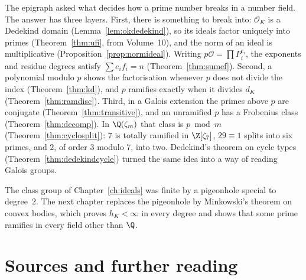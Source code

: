 The epigraph asked what decides how a prime number breaks in a number field. The answer has three layers. First, there
is something to break into: $\mathcal O_K$ is a Dedekind domain (Lemma~\ref{lem:okdedekind}), so its ideals factor
uniquely into primes (Theorem~\ref{thm:ufi}, from Volume~10), and the norm of an ideal is multiplicative
(Proposition~\ref{prop:normideal}). Writing $p\mathcal O=\prod P_i^{e_i}$, the exponents and residue degrees satisfy
$\sum e_if_i=n$ (Theorem~\ref{thm:sumef}). Second, a polynomial modulo $p$ shows the factorisation whenever $p$ does not
divide the index (Theorem~\ref{thm:kd}), and $p$ ramifies exactly when it divides $d_K$ (Theorem~\ref{thm:ramdisc}).
Third, in a Galois extension the primes above $p$ are conjugate (Theorem~\ref{thm:transitive}), and an unramified $p$
has a Frobenius class (Theorem~\ref{thm:decomp}). In $\Q(\zeta_m)$ that class is $p\bmod m$
(Theorem~\ref{thm:cyclosplit}): $7$ is totally ramified in $\Z[\zeta_7]$, $29\equiv1$ splits into six primes, and $2$, of
order $3$ modulo $7$, into two. Dedekind's theorem on cycle types (Theorem~\ref{thm:dedekindcycle}) turned the same idea
into a way of reading Galois groups.

The class group of Chapter~\ref{ch:ideals} was finite by a pigeonhole special to degree~$2$. The next chapter replaces
the pigeonhole by Minkowski's theorem on convex bodies, which proves $h_K<\infty$ in every degree and shows that some
prime ramifies in every field other than $\Q$.

\section*{Sources and further reading}


